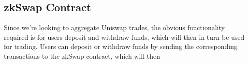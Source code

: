\documentclass[../../thesis.tex]{subfiles}
\begin{document}












\subsection{zkSwap Contract}
Since we're looking to aggregate Uniswap trades, the obvious functionality required is for users deposit and withdraw funds, which will then in turn be used for trading. Users can deposit or withdraw funds by sending the corresponding transactions to the zkSwap contract, which will then
\end{document}
